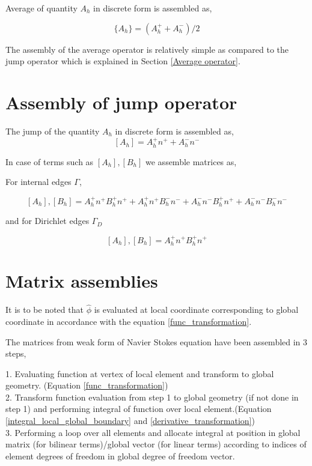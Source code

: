\documentclass[a4paper,openany]{book}
\begin{document}
Average of quantity $A_h$ in discrete form is assembled as,

\begin{equation}\label{Average operator}
\lbrace A_h \rbrace = (A_h^+ + A_h^-)/2
\end{equation}

The assembly of the average operator is relatively simple as compared to the jump operator which is explained in Section \ref{Average operator}.

\section{Assembly of jump operator} \label{Jump operator}

The jump of the quantity $A_h$ in discrete form is assembled as,
\begin{equation} \label{Jump_operator}
[A_h] = A_h^+ n^+ + A_h^- n^-
\end{equation}

In case of terms such as $[A_h],[B_h]$ we assemble matrices as, 

For internal edges $\Gamma$,

\begin{equation} \label{Jump operator L2}
[A_h],[B_h] = A_h^+ n^+ B_h^+ n^+ + A_h^+ n^+ B_h^- n^- + A_h^- n^- B_h^+ n^+ + A_h^- n^- B_h^- n^-
\end{equation}

and for Dirichlet edges $\Gamma_D$

\begin{equation} \label{Jump operator L2 for dirichlet}
[A_h],[B_h] = A_h^+ n^+ B_h^+ n^+ 
\end{equation}


\section{Matrix assemblies} \label{matrix_assembly_ch4}

It is to be noted that $\hat{\phi}$ is evaluated at local coordinate corresponding to global coordinate in accordance with the equation \ref{func_transformation}.

The matrices from weak form of Navier Stokes equation have been assembled in 3 steps,

1. Evaluating function at vertex of local element and transform to global geometry. (Equation \ref{func_transformation})\\
2. Transform function evaluation from step 1 to global geometry (if not done in step 1) and performing integral of function over local element.(Equation \ref{integral_local_global_boundary} and \ref{derivative_transformation})\\
3. Performing a loop over all elements and allocate integral at position in global matrix (for bilinear terms)/global vector (for linear terms) according to indices of element degrees of freedom in global degree of freedom vector.\\
\end{document}
